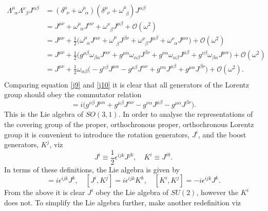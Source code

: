 \begin{equation}
	\begin{split}
		\Lambda^{\mu}_{\,\,\, \alpha}\Lambda^{\nu}_{\,\,\, \beta}J^{\alpha\beta}&=(\delta^\mu_{\,\,\,\nu}+\omega^\mu_{\,\,\,\alpha})(\delta^\mu_{\,\,\,\nu}+\omega^\mu_{\,\,\,\beta})J^{\alpha\beta}\\
		&=J^{\mu\nu}+\omega^\mu_{\,\,\,\alpha}J^{\alpha\nu}+\omega^\nu_{\,\,\,\beta}J^{\mu\beta}+\mathcal{O}(\omega^2)\\
		&=J^{\mu\nu}+\frac{1}{2}\bigg(\omega^\mu_{\,\,\,\alpha}J^{\alpha\nu}+\omega^\mu_{\,\,\,\beta}J^{\beta\nu}+
		\omega^\nu_{\,\,\,\beta}J^{\mu\beta}+\omega^\nu_{\,\,\,\alpha}J^{\mu\alpha}
		\bigg)+\mathcal{O}(\omega^2)\\
		&=J^{\mu\nu}+\frac{1}{2}\bigg(g^{\mu\beta}\omega_{\beta\alpha}J^{\alpha\nu}+g^{\mu\alpha}\omega_{\alpha\beta}J^{\beta\nu}+
		g^{\nu\alpha}\omega_{\alpha\beta}J^{\mu\beta}+g^{\nu\beta}\omega_{\beta\alpha}J^{\mu\alpha}
		\bigg)+\mathcal{O}(\omega^2)\\
		&=J^{\mu\nu}+\frac{1}{2}\omega_{\alpha\beta}\bigg(-g^{\nu\beta}J^{\mu\alpha}-g^{\mu\beta}J^{\alpha\nu}+
		g^{\nu\alpha}J^{\mu\beta}+g^{\mu\alpha}J^{\beta\nu}
		\bigg)+\mathcal{O}(\omega^2).\\
	\end{split}
	\label{j10}
\end{equation} 
Comparing equation \eqref{j9} and \eqref{j10} it is clear that all generators of the Lorentz group should obey the commutator relation
\begin{equation}
	[J^{\mu\nu},J^{\alpha\beta}]=i\bigg(g^{\nu\beta}J^{\mu\alpha}+g^{\mu\beta}J^{\alpha\nu}-
	g^{\nu\alpha}J^{\mu\beta}-g^{\mu\alpha}J^{\beta\nu}\bigg).
\end{equation} 
This is the Lie algebra of $SO(3,1)$. In order to analyse the representations of the covering group of the proper, orthochronous proper, orthochronous Lorentz group it is convenient to introduce the rotation generators, $J^{i}$, and the boost generators, $K^{j}$, viz
\begin{equation}
	J^i\equiv\frac{1}{2}\epsilon^{ijk}J^{jk}, \quad K^i\equiv J^{i0}.
\end{equation} 
In terms of these definitions, the Lie algebra is given by
\begin{equation}
	[J^i,J^j]=i\epsilon^{ijk}J^{k}, \quad [J^i,K^j]=i\epsilon^{ijk}K^{k}, \quad [K^i,K^j]=-i\epsilon^{ijk}J^{k}.
\end{equation} 
From the above it is clear $J^i$ obey the Lie algebra of $SU(2)$, however the $K^i$ does not. To simplify the Lie algebra further, make another redefinition viz
